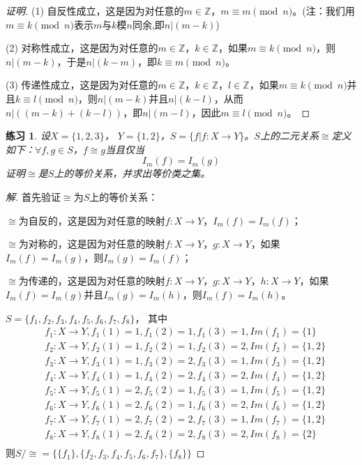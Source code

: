 \documentclass{book}[oneside]
\newtheorem{Exercise}{练习}[chapter]
\begin{document}
\begin{CJK*}{UTF8}{gbsn}
\begin{proof}[证明]
    (1) 自反性成立，这是因为对任意的$m\in \mathbb{Z}$，$m\equiv m \pmod{n}$。(注：我们用$m\equiv k \pmod{n}$表示$m$与$k$模$n$同余,即$n | (m-k)$)

    (2) 对称性成立，这是因为对任意的$m\in \mathbb{Z}$，$k\in \mathbb{Z}$，如果$m\equiv k \pmod{n}$，则$n | (m-k)$，于是$n | (k-m)$，即$k\equiv m \pmod{n}$。

    (3) 传递性成立，这是因为对任意的$m\in \mathbb{Z}$，$k\in \mathbb{Z}$，$l\in \mathbb{Z}$，如果$m\equiv k \pmod{n}$并且$k\equiv l \pmod{n}$，则$n | (m-k)$并且$n | (k-l)$，从而$n | ((m-k) + (k-l))$，即$n | (m-l)$，因此$m\equiv l \pmod{n}$。
  \end{proof}
  \begin{Exercise}
    设$X = \{1,2,3\}$， $Y = \{1,2\}$，$S = \{f|f:X \to Y\}$。$S$上的二元关系$\cong$定义如下：$\forall f,g\in S$，$f \cong g$当且仅当\[I_m(f) = I_m(g)\]证明$\cong$是$S$上的等价关系，并求出等价类之集。      
   \end{Exercise}
   \begin{proof}[解]
     首先验证$\cong$为$S$上的等价关系：
     
     $\cong$为自反的，这是因为对任意的映射$f:X\to Y$，$I_m(f)=I_m(f)$；
 
     $\cong$为对称的，这是因为对任意的映射$f:X\to Y$，$g:X\to Y$，如果$I_m(f)=I_m(g)$，则$I_m(g)=I_m(f)$；
 
     $\cong$为传递的，这是因为对任意的映射$f:X\to Y$，$g:X\to Y$，$h:X\to Y$，如果$I_m(f)=I_m(g)$并且$I_m(g)=I_m(h)$，则$I_m(f)=I_m(h)$。
     
     $S=\{f_1,f_2,f_3,f_4,f_5,f_6,f_7,f_8\}$，
     其中
     \begin{align*}
       &f_1:X\to Y, f_1(1)=1,f_1(2)=1,f_1(3) = 1, Im(f_1)=\{1\}\\
       &f_2:X\to Y, f_2(1)=1,f_2(2)=1,f_2(3) = 2, Im(f_2)=\{1,2\}\\
       &f_3:X\to Y, f_3(1)=1,f_3(2)=2,f_3(3) = 1, Im(f_3)=\{1,2\}\\
       &f_4:X\to Y, f_4(1)=1,f_4(2)=2,f_4(3) = 2, Im(f_4)=\{1,2\}\\
       &f_5:X\to Y, f_5(1)=2,f_5(2)=1,f_5(3) = 1, Im(f_5)=\{1,2\}\\
       &f_6:X\to Y, f_6(1)=2,f_6(2)=1,f_6(3) = 2, Im(f_6)=\{1,2\}\\
       &f_7:X\to Y, f_7(1)=2,f_7(2)=2,f_7(3) = 1, Im(f_7)=\{1,2\}\\
       &f_8:X\to Y, f_8(1)=2,f_8(2)=2,f_8(3) = 2, Im(f_8)=\{2\}\\
     \end{align*}
     则$S/\cong=\{\{f_1\},\{f_2,f_3,f_4,f_5,f_6,f_7\},\{f_8\}\}$
   \end{proof}
 

\end{CJK*}
\end{document}
